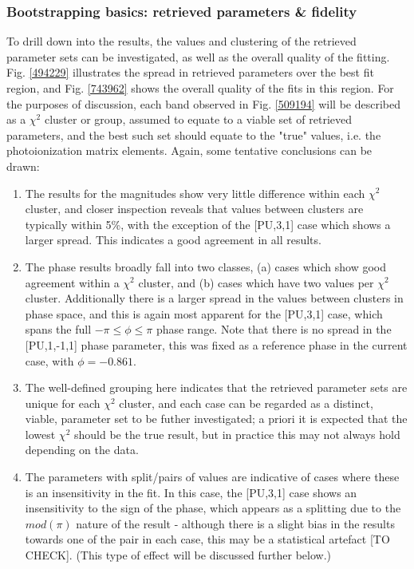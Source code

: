\subsubsection{Bootstrapping basics: retrieved parameters \& fidelity}

To drill down into the results, the values and clustering of the retrieved parameter sets can be investigated, as well as the overall quality of the fitting. Fig. \ref{494229} illustrates the spread in retrieved parameters over the best fit region, and Fig. \ref{743962} shows the overall quality of the fits in this region. For the purposes of discussion, each band observed in Fig. \ref{509194} will be described as a $\chi^2$ cluster or group, assumed to equate to a viable set of retrieved parameters, and the best such set should equate to the "true" values, i.e. the photoionization matrix elements. Again, some tentative conclusions can be drawn:

\begin{enumerate}
\item The results for the magnitudes show very little difference within each $\chi^2$ cluster, and closer inspection reveals that values between clusters are typically within 5\%, with the exception of the [PU,3,1] case which shows a larger spread. This indicates a good agreement in all results.
\item The phase results broadly fall into two classes, (a) cases which show good agreement within a $\chi^2$ cluster, and (b) cases which have two values per $\chi^2$ cluster. Additionally there is a larger spread in the values between clusters in phase space, and this is again most apparent for the [PU,3,1] case, which spans the full $-\pi\leq\phi\leq\pi$ phase range. Note that there is no spread in the [PU,1,-1,1] phase parameter, this was fixed as a reference phase in the current case, with $\phi=-0.861$.
\item The well-defined grouping here indicates that the retrieved parameter sets are unique for each $\chi^2$ cluster, and each case can be regarded as a distinct, viable, parameter set to be futher investigated; a priori it is expected that the lowest $\chi^2$ should be the true result, but in practice this may not always hold depending on the data.
\item The parameters with split/pairs of values are indicative of cases where these is an insensitivity in the fit. In this case, the [PU,3,1] case shows an insensitivity to the sign of the phase, which appears as a splitting due to the $mod(\pi)$ nature of the result - although there is a slight bias in the results towards one of the pair in each case, this may be a statistical artefact [TO CHECK]. (This type of effect will be discussed further below.)
\end{enumerate}

